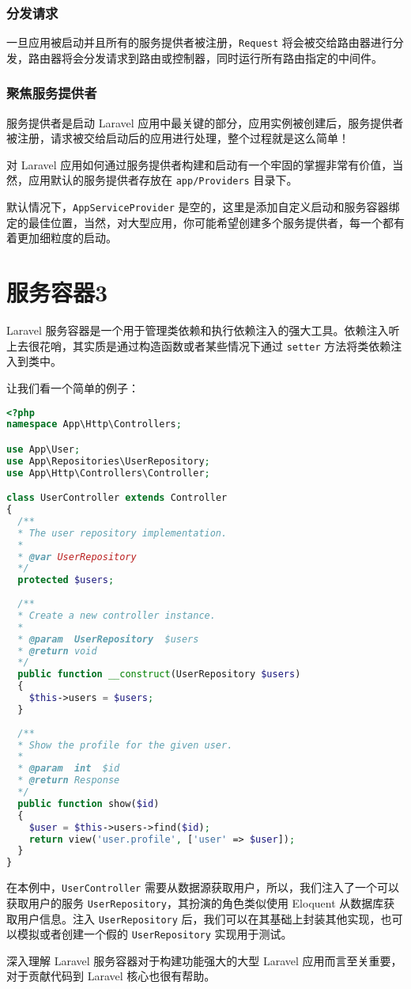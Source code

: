 \documentclass{progartcn}
\begin{document}
\subsubsection{分发请求}

一旦应用被启动并且所有的服务提供者被注册，\verb|Request| 将会被交给路由器进行分发，路由器将会分发请求到路由或控制器，同时运行所有路由指定的中间件。

\subsubsection{聚焦服务提供者}

服务提供者是启动 Laravel 应用中最关键的部分，应用实例被创建后，服务提供者被注册，请求被交给启动后的应用进行处理，整个过程就是这么简单！

对 Laravel 应用如何通过服务提供者构建和启动有一个牢固的掌握非常有价值，当然，应用默认的服务提供者存放在 \verb|app/Providers| 目录下。

默认情况下，\verb|AppServiceProvider| 是空的，这里是添加自定义启动和服务容器绑定的最佳位置，当然，对大型应用，你可能希望创建多个服务提供者，每一个都有着更加细粒度的启动。

\section{服务容器3}

Laravel 服务容器是一个用于管理类依赖和执行依赖注入的强大工具。依赖注入听上去很花哨，其实质是通过构造函数或者某些情况下通过 \verb|setter| 方法将类依赖注入到类中。

让我们看一个简单的例子：

\begin{lstlisting}[language=PHP]
<?php
namespace App\Http\Controllers;

use App\User;
use App\Repositories\UserRepository;
use App\Http\Controllers\Controller;

class UserController extends Controller
{
  /**
  * The user repository implementation.
  *
  * @var UserRepository
  */
  protected $users;
  
  /**
  * Create a new controller instance.
  * 
  * @param  UserRepository  $users
  * @return void
  */
  public function __construct(UserRepository $users)
  {
    $this->users = $users;
  }
  
  /**
  * Show the profile for the given user.
  *
  * @param  int  $id
  * @return Response
  */
  public function show($id)
  {
    $user = $this->users->find($id);
    return view('user.profile', ['user' => $user]);
  }
}
\end{lstlisting}

在本例中，\verb|UserController| 需要从数据源获取用户，所以，我们注入了一个可以获取用户的服务 \verb|UserRepository|，其扮演的角色类似使用 Eloquent 从数据库获取用户信息。注入 \verb|UserRepository| 后，我们可以在其基础上封装其他实现，也可以模拟或者创建一个假的 \verb|UserRepository| 实现用于测试。

深入理解 Laravel 服务容器对于构建功能强大的大型 Laravel 应用而言至关重要，对于贡献代码到 Laravel 核心也很有帮助。

\end{document}
